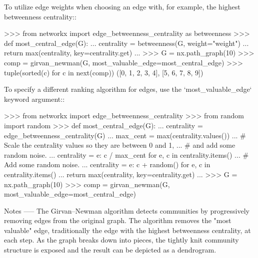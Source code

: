 \begin{DoxyVerb}
To utilize edge weights when choosing an edge with, for example, the
highest betweenness centrality::

    >>> from networkx import edge_betweenness_centrality as betweenness
    >>> def most_central_edge(G):
    ...     centrality = betweenness(G, weight="weight")
    ...     return max(centrality, key=centrality.get)
    ...
    >>> G = nx.path_graph(10)
    >>> comp = girvan_newman(G, most_valuable_edge=most_central_edge)
    >>> tuple(sorted(c) for c in next(comp))
    ([0, 1, 2, 3, 4], [5, 6, 7, 8, 9])

To specify a different ranking algorithm for edges, use the
`most_valuable_edge` keyword argument::

    >>> from networkx import edge_betweenness_centrality
    >>> from random import random
    >>> def most_central_edge(G):
    ...     centrality = edge_betweenness_centrality(G)
    ...     max_cent = max(centrality.values())
    ...     # Scale the centrality values so they are between 0 and 1,
    ...     # and add some random noise.
    ...     centrality = {e: c / max_cent for e, c in centrality.items()}
    ...     # Add some random noise.
    ...     centrality = {e: c + random() for e, c in centrality.items()}
    ...     return max(centrality, key=centrality.get)
    ...
    >>> G = nx.path_graph(10)
    >>> comp = girvan_newman(G, most_valuable_edge=most_central_edge)

Notes
-----
The Girvan–Newman algorithm detects communities by progressively
removing edges from the original graph. The algorithm removes the
"most valuable" edge, traditionally the edge with the highest
betweenness centrality, at each step. As the graph breaks down into
pieces, the tightly knit community structure is exposed and the
result can be depicted as a dendrogram.\end{DoxyVerb}
 